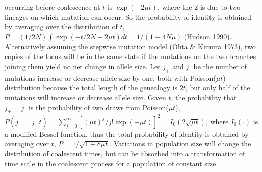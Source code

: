 occurring before coalescence at $t$ is $\exp(-2\mu t)$, where the 2 is due to
two lineages on which mutation can occur.  So the probability of identity is
obtained by averaging over the distribution of $t$,
$P=(1/2N)\int\exp(-t/2N-2\mu t)dt= 1/(1+4N\mu)$ (Hudson 1990).  Alternatively
assuming the stepwise mutation model (Ohta \& Kimura 1973), two copies of the
locus will be in the same state if the mutations on the two branches joining
them yield no net change in allele size.  Let $j_+$ and $j\_$ be the number of
mutations increase or decrease allele size by one, both with Poisson($\mu t$)
distribution because the total length of the genealogy is $2t$, but only half
of the mutations will increase or decrease allele size.  Given $t$, the
probability that $j_+=j\_$ is the probability of two draws from Poisson($\mu
t$), $P(j_+=j\_|t)=\sum_{j=0}^\infty [(\mu t)^j/j!  \exp(-\mu
t)]^2=I_0(2\sqrt{\mu t})$, where $I_0(.)$ is a modified Bessel function, thus
the total probability of identity is obtained by averaging over $t$,
$P=1/\sqrt{1+8\mu t}$.  Variations in population size will change the
distribution of coalescent times, but can be absorbed into a transformation of
time scale in the coalescent process for a population of constant size.

